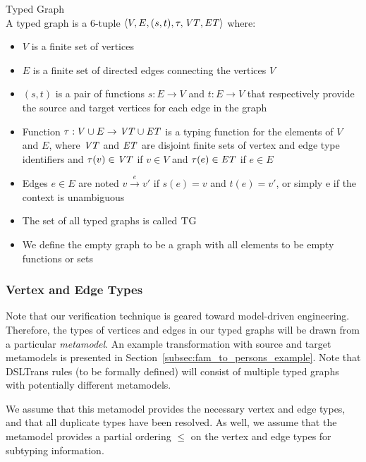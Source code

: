 \begin{definition}{Typed Graph\\}
\label{def:typed_graph}
A typed graph is a 6-tuple $\langle V,E,(s,t),\tau, \mathit{VT}, \mathit{ET}\rangle$ where:
\begin{itemize}
\item $V$ is a finite set of vertices
\item $E$ is a finite set of directed edges connecting the vertices $V$
\item $(s,t)$ is a pair of functions $s: E\rightarrow V$ and $t: E\rightarrow V$ that respectively provide the source and target vertices for each edge in the graph
\item Function $\tau:V\cup E\rightarrow \mathit{VT} \cup \mathit{ET}$ is a typing function for the elements of $V$ and $E$, where $\mathit{VT}$ and $\mathit{ET}$ are disjoint finite sets of vertex and edge type identifiers and $\tau(v)\in \mathit{VT}$ if $v\in V$ and $\tau(e)\in \mathit{ET}$ if $e\in E$
\item Edges $e\in E$ are noted $v\xrightarrow{e} v'$ if $s(e)=v$ and $t(e)=v'$, or simply e if the context is unambiguous
\item The set of all typed graphs is called $\textsc{TG}$
\item We define the empty graph to be a graph with all elements to be empty functions or sets
\end{itemize}
\end{definition}


\subsubsection{Vertex and Edge Types}

Note that our verification technique is geared toward model-driven engineering. Therefore, the types of vertices and edges in our typed graphs will be drawn from a particular \textit{metamodel}. An example transformation with source and target metamodels is presented in Section~\ref{subsec:fam_to_persons_example}. Note that DSLTrans rules (to be formally defined) will consist of multiple typed graphs with potentially different metamodels.

We assume that this metamodel provides the necessary vertex and edge types, and that all duplicate types have been resolved. 
As well, we assume that the metamodel provides a partial ordering $\leq$ on the vertex and edge types for subtyping information.

